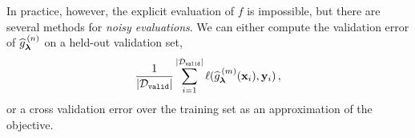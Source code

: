 % 

In practice, however, the explicit evaluation of $f$ is impossible, but there are several methods for \emph{noisy evaluations}. We can either compute the validation error of $\widehat g_{{\boldsymbol \lambda}}^{\,(n)}$ on a held-out validation set,  
\[
    \frac{1}{|\mathcal{D}_{\texttt{valid}}|} \sum_{i=1}^{|\mathcal{D}_{\texttt{valid}}|} \ell(\widehat{g}^{\,(m)}_{{\boldsymbol \lambda}}({\bf x}_i),{\bf y}_i)\,,
\]
or a cross validation error over the training set as an approximation of the  objective. %
